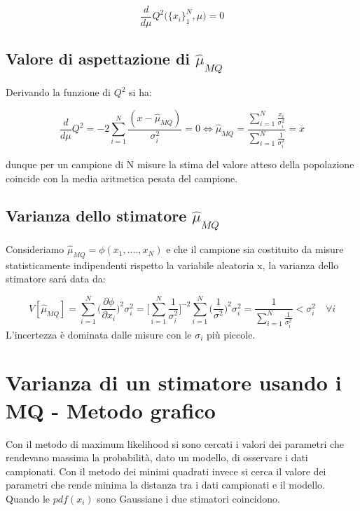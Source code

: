 \begin{equation}
	\dfrac{d}{d\mu}Q^2 \Big(\{x_i\}_1^N, \mu \Big) = 0
\end{equation}
 

\subsection{Valore di aspettazione di $\hat{\mu}_{MQ}$}

Derivando la funzione di $Q^2$ si ha:

\begin{equation*}
	\dfrac{d}{d\mu}Q^2 = -2 \sum_{i=1}^N \dfrac{(x-\hat{\mu}_{MQ})}{\sigma_i^2} = 0 \iff  \hat{\mu}_{MQ} = \dfrac{\sum_{i=1}^N \frac{x_i}{\sigma_i^2}}{\sum_{i=1}^N \frac{1}{\sigma^2_i}}= \overline{x}
\end{equation*}

\noindent dunque per un campione di N misure la stima del valore atteso della popolazione coincide con la media aritmetica pesata del campione.

\subsection{Varianza dello stimatore $\hat{\mu}_{MQ}$}

Consideriamo $\hat{\mu}_{MQ} = \phi(x_1,....,x_N)$ e che il campione sia costituito da misure statisticamente indipendenti rispetto la variabile aleatoria x, la varianza dello stimatore sar\'{a} data da:

\begin{equation*}
	V[\hat{\mu}_{MQ}] = \sum_{i=1}^{N} \Big (\dfrac{\partial \phi}{\partial x_{i}} \Big)^2 \sigma_i^2 = \Big [\sum_{i=1}^N \frac{1}{\sigma^2_i} \Big ]^{-2} \sum_{i=1}^N \Big(\dfrac{1}{\sigma^2}\Big)^2 \sigma_i^2 = \dfrac{1}{\sum_{i=1}^N \frac{1}{\sigma^2_i}} < \sigma_i^2 \quad \forall i  
\end{equation*}
L'incertezza \`{e} dominata dalle misure con le $\sigma_{i}$ pi\`{u} piccole.

\section{Varianza di un stimatore usando i MQ - Metodo grafico}

Con il metodo di maximum likelihood si sono cercati i valori dei parametri che rendevano massima la probabilit\`{a}, dato un modello, di osservare i dati campionati. Con il metodo dei minimi quadrati invece si cerca il valore dei parametri che rende minima la distanza tra i dati campionati e il modello. Quando le $pdf(x_i)$ sono Gaussiane i due stimatori coincidono.


